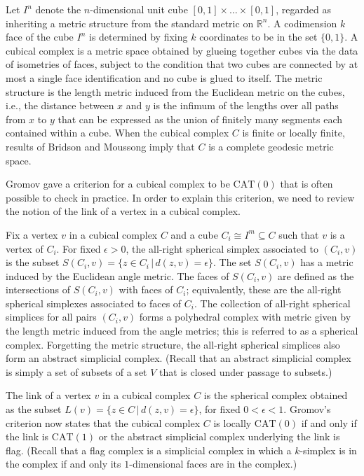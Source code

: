 \documentclass[a4paper,11pt]{article}
\newcommand{\CAT}{\textrm{CAT}}
\begin{document}
Let $I^n$ denote the $n$-dimensional unit cube $[0,1] \times \ldots \times [0,1]$, regarded as inheriting a metric structure from the standard metric on $\mathbb{R}^n$.
A codimension $k$ face of the cube $I^n$ is determined by fixing $k$ coordinates to be in the set $\{0,1\}$.
A cubical complex is a metric space obtained by glueing together cubes via the data of isometries of faces, subject to the condition that two cubes are connected by at most a single face identification and no cube is glued to itself.
The metric structure is the length metric induced from the Euclidean metric on the cubes, i.e., the distance between $x$ and $y$ is the infimum of the lengths over all paths from $x$ to $y$ that can be expressed as the union of finitely many segments each contained within a cube.
When the cubical complex $C$ is finite or locally finite, results of Bridson and Moussong imply that $C$ is a complete geodesic metric space.

Gromov gave a criterion for a cubical complex to be $\CAT(0)$ that is often possible to check in practice.
In order to explain this criterion, we need to review the notion of the link of a vertex in a cubical complex.

Fix a vertex $v$ in a cubical complex $C$ and a cube $C_i \cong I^m \subseteq C$ such that $v$ is a vertex of $C_i$.
For fixed $\epsilon > 0$, the all-right spherical simplex associated to $(C_i,v)$ is the subset $S(C_i,v) = \{z \in C_i \, | \, d(z,v) = \epsilon\}$.
The set $S(C_i,v)$ has a metric induced by the Euclidean angle metric.
The faces of $S(C_i,v)$ are defined as the intersections of $S(C_i,v)$ with faces of $C_i$; equivalently, these are the all-right spherical simplexes associated to faces of $C_i$.
The collection of all-right spherical simplices for all pairs $(C_i, v)$ forms a polyhedral complex with metric given by the length metric induced from the angle metrics; this is referred to as a spherical complex.
Forgetting the metric structure, the all-right spherical simplices also form an abstract simplicial complex. (Recall that an abstract simplicial complex is simply a set of subsets of a set $V$ that is closed under passage to subsets.)

The link of a vertex $v$ in a cubical complex $C$ is the spherical complex obtained as the subset $L(v) = \{z \in C \, | \, d(z,v) = \epsilon\}$, for fixed $0 < \epsilon < 1$.
Gromov's criterion now states that the cubical complex $C$ is locally $\CAT(0)$ if and only if the link is $\CAT(1)$ or the abstract simplicial complex underlying the link is flag.
(Recall that a flag complex is a simplicial complex in which a $k$-simplex is in the complex if and only its $1$-dimensional faces are in the complex.)
\end{document}
